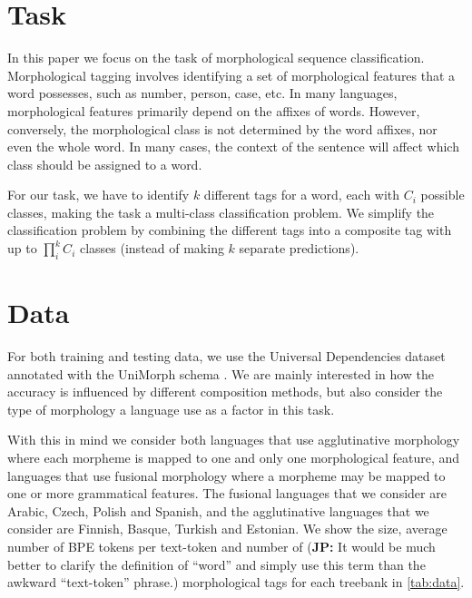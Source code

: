 \documentclass[11pt]{article}
\newcommand\jp[1]{(\textbf{JP:} #1)}
\newcommand\citep{\cite}
\begin{document}
    \section{Task}
             In this paper we focus on the task of
     morphological sequence classification. Morphological tagging
     involves identifying a set of morphological features that a word
     possesses, such as number, person, case, etc. In many languages,
     morphological features primarily depend on the affixes of
     words. However, conversely, the morphological class is not
     determined by the word affixes, nor even the whole word. In many
     cases, the context of the sentence will affect which class should
     be assigned to a word.

     For our task, we have to identify $k$ different tags for a word,
     each with $C_i$ possible classes, making the task a multi-class
     classification problem. We simplify the classification problem by
     combining the different tags into a composite tag with up to
     $\prod _i^k C_i$ classes (instead of making $k$ separate
     predictions).

    \section{Data}
    
            For both training and testing data, we use the Universal
     Dependencies dataset \citep{nivre2018} annotated with the
     UniMorph schema \citep{mccarthy2018marrying}.  We are mainly
     interested in how the accuracy is influenced by different
     composition methods, but also consider the type of morphology a
     language use as a factor in this task.
    
%
    With this in mind we consider both
     languages that use agglutinative morphology where each morpheme
     is mapped to one and only one morphological feature, and
     languages that use fusional morphology where a morpheme may be
     mapped to one or more grammatical features. 
%
%
           	The fusional languages that we consider are Arabic, Czech,
     Polish and Spanish, and the agglutinative languages that we
     consider are Finnish, Basque, Turkish and Estonian.  We show the
     size, average number of BPE tokens per text-token and number of \jp{It would be much better to clarify the definition of ``word'' and simply use this term than the awkward ``text-token'' phrase.}
     morphological tags for each treebank in \cref{tab:data}.
    
\end{document}
